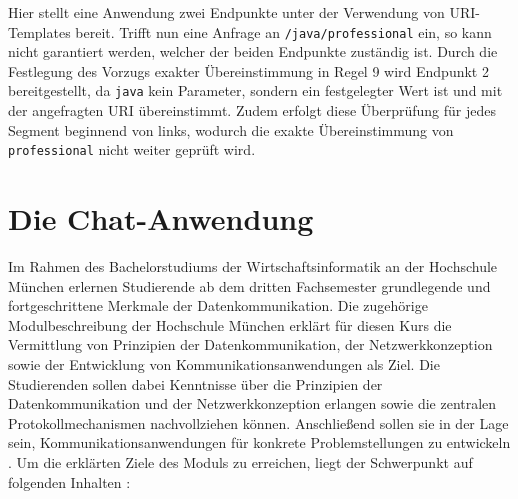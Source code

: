 \documentclass[11pt,a4paper,titlepage]{scrartcl}
\numberwithin{equation}{section}
\begin{document}
\noindent Hier stellt eine Anwendung zwei Endpunkte unter der Verwendung von URI-Templates bereit. Trifft nun eine Anfrage an \texttt{/java/professional} ein, so kann nicht garantiert werden, welcher der beiden Endpunkte zuständig ist. Durch die Festlegung des Vorzugs exakter Übereinstimmung in Regel 9 wird Endpunkt 2 bereitgestellt, da \texttt{java} kein Parameter, sondern ein festgelegter Wert ist und mit der angefragten URI übereinstimmt. Zudem erfolgt diese Überprüfung für jedes Segment beginnend von links, wodurch die exakte Übereinstimmung von \texttt{professional} nicht weiter geprüft wird.

\newpage
\section{Die Chat-Anwendung}\label{sec:Dako}
Im Rahmen des Bachelorstudiums der Wirtschaftsinformatik an der Hochschule München erlernen Studierende ab dem dritten Fachsemester grundlegende und fortgeschrittene Merkmale der Datenkommunikation. Die zugehörige Modulbeschreibung der Hochschule München erklärt für diesen Kurs die Vermittlung von Prinzipien der Datenkommunikation, der Netzwerkkonzeption sowie der Entwicklung von Kommunikationsanwendungen als Ziel. Die Studierenden sollen dabei Kenntnisse über die Prinzipien der Datenkommunikation und der Netzwerkkonzeption erlangen sowie die zentralen Protokollmechanismen nachvollziehen können. Anschließend sollen sie in der Lage sein, Kommunikationsanwendungen für konkrete Problemstellungen zu entwickeln \autocite[siehe][]{hochschule_munchen_modulhandbuch_2017}. Um die erklärten Ziele des Moduls zu erreichen, liegt der Schwerpunkt auf folgenden Inhalten \autocite[aus][]{mandl_datenkommunikation_2017}:

\begin{itemize}
\end{itemize}
\end{document}
